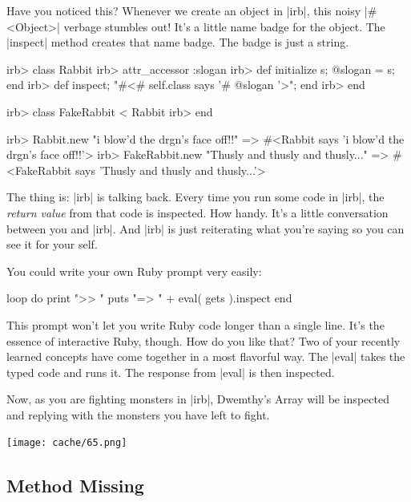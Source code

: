 \documentclass[12pt,twoside]{report}
\begin{document}
Have you noticed this?  Whenever we create an object in
\rubyinline|irb|, this noisy
\rubyinline|#<Object>| verbage stumbles out!  It's a
little name badge for the object.  The
\rubyinline|inspect| method creates that name badge.
The badge is just a string.


\begin{consolecode}

 irb> class Rabbit
 irb>   attr_accessor :slogan
 irb>   def initialize s; @slogan = s; end
 irb>   def inspect; "#<#{ self.class } says '#{ @slogan }'>"; end
 irb> end

 irb> class FakeRabbit < Rabbit
 irb> end

 irb> Rabbit.new "i blow'd the drgn's face off!!"
   => #<Rabbit says 'i blow'd the drgn's face off!!'>
 irb> FakeRabbit.new "Thusly and thusly and thusly..."
   => #<FakeRabbit says 'Thusly and thusly and thusly...'>

\end{consolecode}


The thing is: \rubyinline|irb| is talking back.  Every
time you run some code in \rubyinline|irb|, the {\em
  return value} from that code is inspected.  How handy.  It's a
little conversation between you and \rubyinline|irb|.
And \rubyinline|irb| is just reiterating what you're
saying so you can see it for your self.

You could write your own Ruby prompt very easily:


\begin{rubycode}

 loop do
   print ">> "
   puts  "=> " + eval( gets ).inspect
 end

\end{rubycode}


This prompt won't let you write Ruby code longer than a single line.
It's the essence of interactive Ruby, though.  How do you like that?
Two of your recently learned concepts have come together in a most
flavorful way.  The \rubyinline|eval| takes the typed
code and runs it. The response from \rubyinline|eval|
is then inspected.

Now, as you are fighting monsters in \rubyinline|irb|,
Dwemthy's Array will be inspected and replying with the monsters you
have left to fight.

	\texttt{[image: cache/65.png]}



\subsection{Method Missing}
\end{document}
